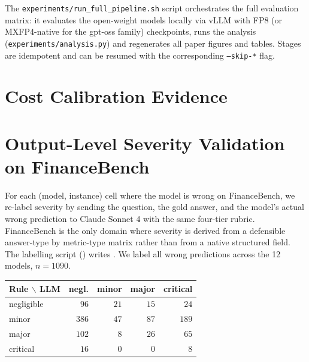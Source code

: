 \documentclass[11pt]{article}
\begin{document}
The \texttt{experiments/run\_full\_pipeline.sh} script orchestrates
the full evaluation matrix: it evaluates the open-weight models
locally via vLLM with FP8 (or MXFP4-native for the gpt-oss family)
checkpoints, runs the analysis
(\texttt{experiments/analysis.py}) and regenerates all paper
figures and tables. Stages are idempotent and can be resumed with
the corresponding \texttt{--skip-*} flag.

\section{Cost Calibration Evidence}
\label{sec:app-calibration}



\section{Output-Level Severity Validation on FinanceBench}
\label{sec:app-output-severity}

For each (model, instance) cell where the model is wrong on
FinanceBench, we re-label severity by sending the question, the
gold answer, and the model's actual wrong prediction to Claude
Sonnet 4 with the same four-tier rubric. FinanceBench is the
only domain where severity is derived from a defensible
answer-type by metric-type matrix rather than from a native
structured field. The labelling script
() writes
. We label
all wrong predictions across the 12 models, $n=1090$.

\begin{center}
\small
\begin{tabular}{lrrrr}
\toprule
Rule $\backslash$ LLM & negl. & minor & major & critical \\
\midrule
negligible & $96$  & $21$  & $15$ & $24$  \\
minor      & $386$ & $47$  & $87$ & $189$ \\
major      & $102$ & $8$   & $26$ & $65$  \\
critical   & $16$  & $0$   & $0$  & $8$   \\
\bottomrule
\end{tabular}
\end{center}
\end{document}
